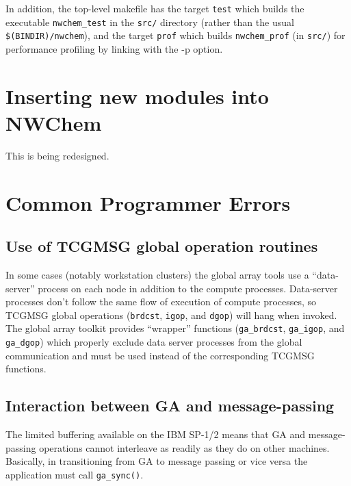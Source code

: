 In addition, the top-level makefile has the target {\tt test} which
builds the executable \verb+nwchem_test+ in the \verb+src/+ directory
(rather than the usual \verb+$(BINDIR)/nwchem+), and the target {\tt prof} 
which builds \verb+nwchem_prof+ (in \verb+src/+)
for performance profiling by linking with the -p option.

\section{Inserting new modules into NWChem}

This is being redesigned.

\section{Common Programmer Errors}

\subsection{Use of TCGMSG global operation routines}

In some cases (notably workstation clusters) the global array tools
use a ``data-server'' process on each node in addition to the compute
processes.  Data-server processes don't follow the same flow of
execution of compute processes, so TCGMSG global operations
(\verb+brdcst+, \verb+igop+, and \verb+dgop+) will hang when invoked.
The global array toolkit provides ``wrapper'' functions
(\verb+ga_brdcst+, \verb+ga_igop+, and \verb+ga_dgop+) which properly
exclude data server processes from the global communication and must
be used instead of the corresponding TCGMSG functions.

\subsection{Interaction between GA and message-passing}

The limited buffering available on the IBM SP-1/2 means that GA and
message-passing operations cannot interleave as readily as they do on
other machines.  Basically, in transitioning from GA to message
passing or vice versa the application must call {\tt ga\_sync()}.

